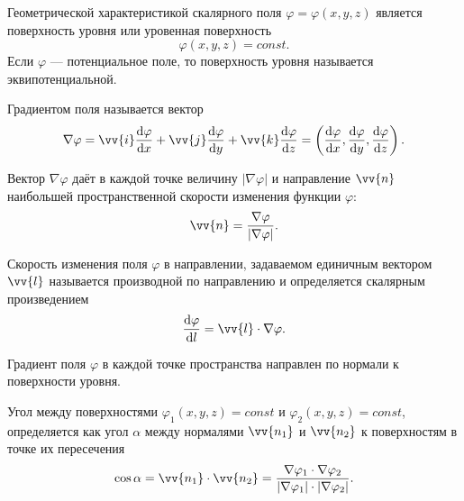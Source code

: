\documentclass[11pt, a4paper]{article}
\theoremstyle{plain}
\theoremstyle{definition}
\theoremstyle{remark}
\renewcommand{\phi}{\ensuremath{\varphi}}
\begin{document}
Геометрической характеристикой скалярного поля $\phi = \phi \left(x, y, z\right)$ является поверхность уровня или уровенная поверхность
\begin{equation*}
    \phi \left(x, y, z\right) = const.
\end{equation*}
Если $\phi$ --- потенциальное поле, то поверхность уровня называется эквипотенциальной.

Градиентом поля называется вектор
\begin{equation*}
    \nabla \phi = \vv{i} \dfrac{\dif \phi}{\dif x} + \vv{j} \dfrac{\dif \phi}{\dif y} + \vv{k} \dfrac{\dif \phi}{\dif z} = \left(\dfrac{\dif \phi}{\dif x}, \dfrac{\dif \phi}{\dif y}, \dfrac{\dif \phi}{\dif z} \right).
\end{equation*}

Вектор $\nabla \phi$ даёт в каждой точке величину $|\nabla \phi|$ и направление $\vv{n}$ наибольшей пространственной скорости изменения функции $\phi$:
\begin{equation*}
    \vv{n} = \dfrac{\nabla \phi}{|\nabla \phi|}.
\end{equation*}

Скорость изменения поля $\phi$ в направлении, задаваемом единичным вектором $\vv{l}$ называется производной по направлению и определяется скалярным произведением
\begin{equation*}
    \dfrac{\dif \phi}{\dif l} = \vv{l} \cdot \nabla \phi.
\end{equation*}

Градиент поля $\phi$ в каждой точке пространства направлен по нормали к поверхности уровня.

Угол между поверхностями $\phi_1 \left(x, y, z\right) = const$ и $\phi_2 \left(x, y, z\right) = const$, определяется как угол $\alpha$ между нормалями $\vv{n_1}$ и $\vv{n_2}$ к поверхностям в точке их пересечения
\begin{equation*}
    \cos \alpha = \vv{n_1} \cdot \vv{n_2} = \dfrac{\nabla \phi_1 \cdot \nabla \phi_2}{|\nabla \phi_1| \cdot |\nabla \phi_2|}.
\end{equation*}
\end{document}
